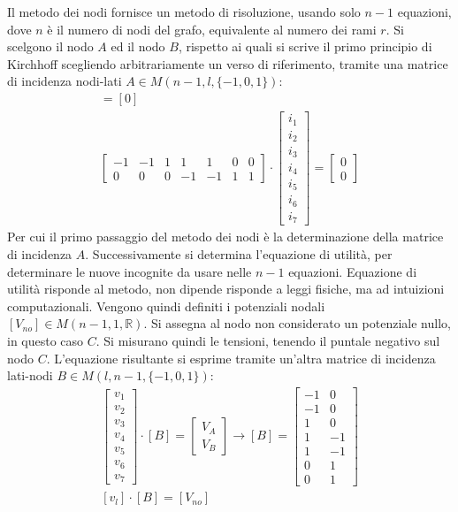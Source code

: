 \documentclass{article}
\numberwithin{equation}{subsection}
\begin{document}
Il metodo dei nodi fornisce un metodo di risoluzione, usando solo $n-1$ equazioni, dove $n$ è il numero di nodi del grafo, equivalente al numero dei rami $r$. 
Si scelgono il nodo $A$ ed il nodo $B$, rispetto ai quali si scrive il primo principio di Kirchhoff scegliendo arbitrariamente un verso di riferimento, tramite una matrice di 
incidenza nodi-lati $A\in M(n-1,l,\{-1,0,1\})$:
\begin{gather*}
    [A][i_l]=[0]\\
    \begin{bmatrix}
        -1&-1&1&1&1&0&0\\
        0&0&0&-1&-1&1&1
    \end{bmatrix}\cdot\begin{bmatrix}
        i_1\\
        i_2\\
        i_3\\
        i_4\\
        i_5\\
        i_6\\
        i_7
    \end{bmatrix}=\begin{bmatrix}
        0\\
        0
    \end{bmatrix}
\end{gather*}
Per cui il primo passaggio del metodo dei nodi è la determinazione della matrice di incidenza $A$. Successivamente si determina l'equazione di utilità, per determinare le nuove 
incognite da usare nelle $n-1$ equazioni. Equazione di utilità risponde al metodo, non dipende risponde a leggi fisiche, ma ad intuizioni computazionali. 
Vengono quindi definiti i potenziali nodali $[V_{no}]\in M(n-1,1,\mathbb{R})$. Si assegna al nodo non considerato un potenziale nullo, in questo caso $C$. 
Si misurano quindi le tensioni, tenendo il puntale negativo sul nodo $C$. L'equazione risultante si esprime tramite un'altra matrice di incidenza lati-nodi $B\in M(l,n-1,\{-1,0,1\})$: 
\begin{gather*}
    \begin{bmatrix}
        v_1\\
        v_2\\
        v_3\\
        v_4\\
        v_5\\
        v_6\\
        v_7
    \end{bmatrix}\cdot[B]=\begin{bmatrix}
        V_A\\
        V_B
    \end{bmatrix}\to[B]=\begin{bmatrix}
        -1&0\\
        -1&0\\
        1&0\\
        1&-1\\
        1&-1\\
        0&1\\
        0&1
    \end{bmatrix}\\
    [v_l]\cdot[B]=[V_{no}]
\end{gather*}
\end{document}
